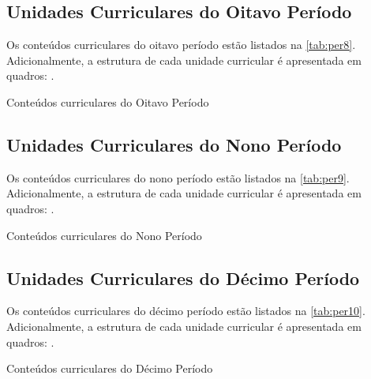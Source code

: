 \clearpage

\subsection{Unidades Curriculares do Oitavo Período}

Os conteúdos curriculares do oitavo período estão listados na \autoref{tab:per8}. Adicionalmente, a estrutura de cada unidade curricular é apresentada em quadros: .

\begin{table}[!htb]
	\centering\footnotesize
	\caption{Conteúdos curriculares do Oitavo Período}
	\label{tab:per8}
\end{table}

\clearpage

\subsection{Unidades Curriculares do Nono Período}

Os conteúdos curriculares do nono período estão listados na \autoref{tab:per9}. Adicionalmente, a estrutura de cada unidade curricular é apresentada em quadros: .

\begin{table}[!htb]
	\centering\footnotesize
	\caption{Conteúdos curriculares do Nono Período}
	\label{tab:per9}
\end{table}

\clearpage

\subsection{Unidades Curriculares do Décimo Período}

Os conteúdos curriculares do décimo período estão listados na \autoref{tab:per10}. Adicionalmente, a estrutura de cada unidade curricular é apresentada em quadros: .

\begin{table}[!htb]
	\centering\footnotesize
	\caption{Conteúdos curriculares do Décimo Período}
	\label{tab:per10}
\end{table}

